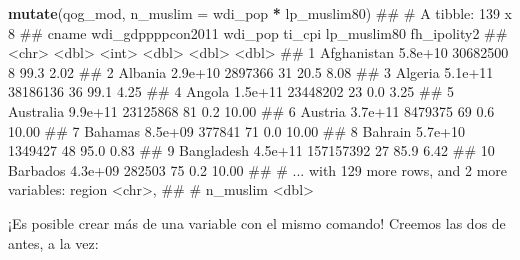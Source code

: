 \documentclass[]{book}
\newenvironment{Shaded}{\begin{snugshade}}{\end{snugshade}}
\newcommand{\KeywordTok}[1]{\textcolor[rgb]{0.13,0.29,0.53}{\textbf{#1}}}
\newcommand{\DataTypeTok}[1]{\textcolor[rgb]{0.13,0.29,0.53}{#1}}
\newcommand{\StringTok}[1]{\textcolor[rgb]{0.31,0.60,0.02}{#1}}
\newcommand{\OperatorTok}[1]{\textcolor[rgb]{0.81,0.36,0.00}{\textbf{#1}}}
\newcommand{\NormalTok}[1]{#1}
\begin{document}
\begin{Shaded}
\begin{Highlighting}[]
\KeywordTok{mutate}\NormalTok{(qog_mod, }\DataTypeTok{n_muslim =}\NormalTok{ wdi_pop }\OperatorTok{*}\StringTok{ }\NormalTok{lp_muslim80)}
\NormalTok{## # A tibble: 139 x 8}
\NormalTok{##          cname wdi_gdppppcon2011   wdi_pop ti_cpi lp_muslim80 fh_ipolity2}
\NormalTok{##          <chr>             <dbl>     <int>  <dbl>       <dbl>       <dbl>}
\NormalTok{##  1 Afghanistan           5.8e+10  30682500      8        99.3        2.02}
\NormalTok{##  2     Albania           2.9e+10   2897366     31        20.5        8.08}
\NormalTok{##  3     Algeria           5.1e+11  38186136     36        99.1        4.25}
\NormalTok{##  4      Angola           1.5e+11  23448202     23         0.0        3.25}
\NormalTok{##  5   Australia           9.9e+11  23125868     81         0.2       10.00}
\NormalTok{##  6     Austria           3.7e+11   8479375     69         0.6       10.00}
\NormalTok{##  7     Bahamas           8.5e+09    377841     71         0.0       10.00}
\NormalTok{##  8     Bahrain           5.7e+10   1349427     48        95.0        0.83}
\NormalTok{##  9  Bangladesh           4.5e+11 157157392     27        85.9        6.42}
\NormalTok{## 10    Barbados           4.3e+09    282503     75         0.2       10.00}
\NormalTok{## # ... with 129 more rows, and 2 more variables: region <chr>,}
\NormalTok{## #   n_muslim <dbl>}
\end{Highlighting}
\end{Shaded}

¡Es posible crear más de una variable con el mismo comando! Creemos las
dos de antes, a la vez:
\end{document}
